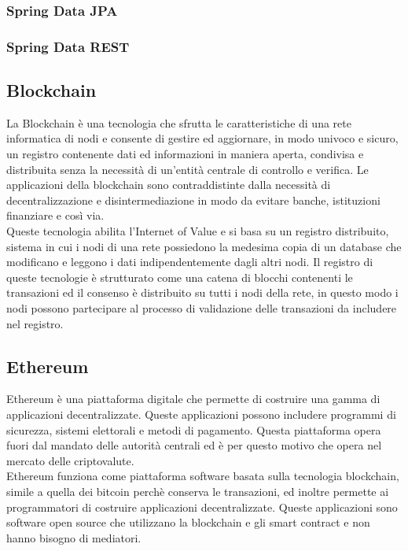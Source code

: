 \subsubsection{Spring Data JPA}

\subsubsection{Spring Data REST}

\subsection{Blockchain}

La Blockchain è una tecnologia che sfrutta le caratteristiche di una rete informatica di nodi e consente di gestire ed aggiornare, in modo univoco e sicuro, un registro contenente dati ed informazioni in maniera aperta, condivisa e distribuita senza la necessità di un'entità centrale di controllo e verifica. Le applicazioni della blockchain sono contraddistinte dalla necessità di decentralizzazione e disintermediazione in modo da evitare banche, istituzioni finanziare e così via.\\
Queste tecnologia abilita l'Internet of Value e si basa su un registro distribuito, sistema in cui i nodi di una rete possiedono la medesima copia di un database che modificano e leggono i dati indipendentemente dagli altri nodi. Il registro di queste tecnologie è strutturato come una catena di blocchi contenenti le transazioni ed il consenso è distribuito su tutti i nodi della rete, in questo modo i nodi possono partecipare al processo di validazione delle transazioni da includere nel registro.

\subsection{Ethereum}

Ethereum è una piattaforma digitale che permette di costruire una gamma di applicazioni decentralizzate. Queste applicazioni possono includere programmi di sicurezza, sistemi elettorali e metodi di pagamento. Questa piattaforma opera fuori dal mandato delle autorità centrali ed è per questo motivo che opera nel mercato delle criptovalute.\\
Ethereum funziona come piattaforma software basata sulla tecnologia blockchain, simile a quella dei bitcoin perchè conserva le transazioni, ed inoltre permette ai programmatori di costruire applicazioni decentralizzate. Queste applicazioni sono software open source che utilizzano la blockchain e gli smart contract e non hanno bisogno di mediatori. 

